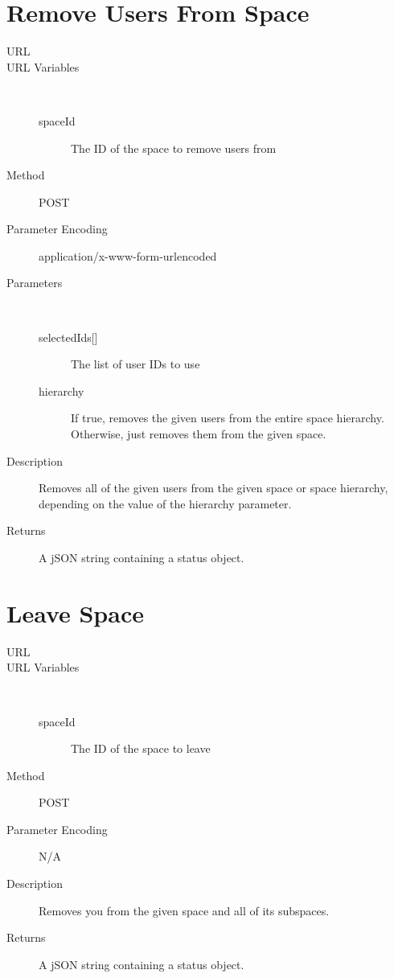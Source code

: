 \section{Remove Users From Space}
\begin{description}
\item [URL] 
\item [URL Variables] \
	\begin{description}
	\item [spaceId]  The ID of the space to remove users from
	\end{description}
\item [Method] POST
\item [Parameter Encoding] application/x-www-form-urlencoded
\item [Parameters] \
	\begin{description}
	\item [{selectedIds[]}]  The list of user IDs to use
	\item [hierarchy]  If true, removes the given users from the entire space hierarchy. Otherwise, just removes them from the given space.
	\end{description}
\item [Description] Removes all of the given users from the given space or space hierarchy, depending on the value of the hierarchy parameter.
\item [Returns] A jSON string containing a status object.
\end{description}


\section{Leave Space}
\begin{description}
\item [URL] 
\item [URL Variables] \
	\begin{description}
	\item [spaceId] \type{Integer} The ID of the space to leave
	\end{description}
\item [Method] POST
\item [Parameter Encoding] N/A
\item [Description] Removes you from the given space and all of its subspaces.
\item [Returns] A jSON string containing a status object.
\end{description}


